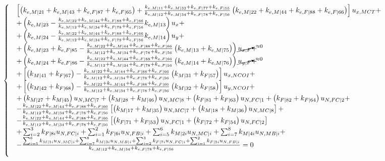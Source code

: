 \documentclass[a4paper]{jpconf}
\begin{document}
\begin{equation}
\begin{cases}
&\left[\left(k_{e,M|21}+k_{e,M|43}+k_{e,F|87}+k_{e,F|65}\right)+\frac{k_{e,M|11}+k_{e,M|33}+k_{e,F|77}+k_{e,F|55}}{k_{e,M|12}+k_{e,M|34}+k_{e,F|78}+k_{e,F|56}}\left(k_{e,M|22}+k_{e,M|44}+k_{e,F|88}+k_{e,F|66}\right)\right]u_{x,MCT}+\\
&+\left(k_{e,M|23}-\frac{k_{e,M|22}+k_{e,M|44}+k_{e,F|88}+k_{e,F|66}}{k_{e,M|12}+k_{e,M|34}+k_{e,F|78}+k_{e,F|56}}k_{e,M|13}\right)u_{x}+\\
&+\left(k_{e,M|24}-\frac{k_{e,M|22}+k_{e,M|44}+k_{e,F|88}+k_{e,F|66}}{k_{e,M|12}+k_{e,M|34}+k_{e,F|78}+k_{e,F|56}}k_{e,M|14}\right)u_{y}+\\
&+\left(k_{e,M|23}+k_{e,F|85}-\frac{k_{e,M|22}+k_{e,M|44}+k_{e,F|88}+k_{e,F|66}}{k_{e,M|12}+k_{e,M|34}+k_{e,F|78}+k_{e,F|56}}\left(k_{e,M|13}+k_{e,M|75}\right)\right)\cancelto{\approx 0}{u_{x,F}}+\\
&+\left(k_{e,M|24}+k_{e,F|86}-\frac{k_{e,M|22}+k_{e,M|44}+k_{e,F|88}+k_{e,F|66}}{k_{e,M|12}+k_{e,M|34}+k_{e,F|78}+k_{e,F|56}}\left(k_{e,M|14}+k_{e,M|76}\right)\right)\cancelto{\approx 0}{u_{y,F}}+\\
&+\left[\left(k_{M|41}+k_{F|67}\right)-\frac{k_{e,M|22}+k_{e,M|44}+k_{e,F|88}+k_{e,F|66}}{k_{e,M|12}+k_{e,M|34}+k_{e,F|78}+k_{e,F|56}}\left(k_{M|31}+k_{F|57}\right)\right]u_{x,NCOI}+\\
&+\left[\left(k_{M|42}+k_{F|68}\right)-\frac{k_{e,M|22}+k_{e,M|44}+k_{e,F|88}+k_{e,F|66}}{k_{e,M|12}+k_{e,M|34}+k_{e,F|78}+k_{e,F|56}}\left(k_{M|32}+k_{F|58}\right)\right]u_{y,NCOI}+\\
&+\left(k_{M|27}+k_{M|45}\right)u_{N,MC|7}+\left(k_{M|28}+k_{M|46}\right)u_{N,MC|8}+\left(k_{F|81}+k_{F|63}\right)u_{N,FC|1}+\left(k_{F|82}+k_{F|64}\right)u_{N,FC|2}+\\
&-\frac{k_{e,M|22}+k_{e,M|44}+k_{e,F|88}+k_{e,F|66}}{k_{e,M|12}+k_{e,M|34}+k_{e,F|78}+k_{e,F|56}}\left[\left(k_{M|17}+k_{M|35}\right)u_{N,MC|7}+\left(k_{M|18}+k_{M|36}\right)u_{N,MC|8}\right]+\\&
-\frac{k_{e,M|22}+k_{e,M|44}+k_{e,F|88}+k_{e,F|66}}{k_{e,M|12}+k_{e,M|34}+k_{e,F|78}+k_{e,F|56}}\left[\left(k_{F|71}+k_{F|53}\right)u_{N,FC|1}+\left(k_{F|72}+k_{F|54}\right)u_{N,FC|2}\right]\\
&+\sum_{i=2}^{3}k_{F|8i}u_{N,FC|i}+\sum_{i=1}^{2}k_{F|6i}u_{N,FB|i}+\sum_{i=5}^{6}k_{M|2i}u_{N,MC|i}+\sum_{i=7}^{8}k_{M|4i}u_{N,MB|i}+\\
&-\frac{\sum_{i=5}^{6}k_{M|1i}u_{N,MC|i}+\sum_{i=7}^{8}k_{M|3i}u_{N,MB|i}+\sum_{i=2}^{3}k_{F|7i}u_{N,FC|i}+\sum_{i=1}^{2}k_{F|5i}u_{N,FB|i}}{k_{e,M|12}+k_{e,M|34}+k_{e,F|78}+k_{e,F|56}}=0\\[10pt]


\end{cases}
\end{equation}
\end{document}
